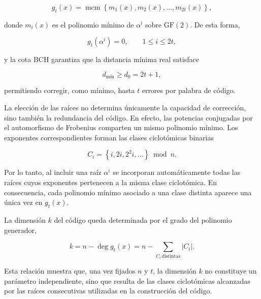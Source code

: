 \documentclass[10pt,a4paper]{article}
\begin{document}
\begin{equation}
    g_t(x)
    =
    \operatorname{mcm}
    \left\{
        m_1(x),m_2(x),\ldots,m_{2t}(x)
    \right\},
    \label{eq:generador-bch-general}
\end{equation}

donde $m_i(x)$ es el polinomio mínimo de $\alpha^i$ sobre $\mathrm{GF}(2)$.
De esta forma,

\begin{equation}
    g_t(\alpha^i)=0,
    \qquad 1\leq i\leq2t,
\end{equation}

y la cota BCH garantiza que la distancia mínima real satisface

\begin{equation}
    d_{\min}\geq d_0=2t+1,
\end{equation}

permitiendo corregir, como mínimo, hasta $t$ errores por palabra de código.

La elección de las raíces no determina únicamente la capacidad de corrección,
sino también la redundancia del código. En efecto, las potencias conjugadas
por el automorfismo de Frobenius comparten un mismo polinomio mínimo. Los
exponentes correspondientes forman las clases ciclotómicas binarias

\begin{equation}
    C_i
    =
    \left\{
        i,2i,2^2i,\ldots
    \right\}
    \bmod n.
    \label{eq:clase-ciclotomica}
\end{equation}

Por lo tanto, al incluir una raíz $\alpha^i$ se incorporan automáticamente
todas las raíces cuyos exponentes pertenecen a la misma clase ciclotómica.
En consecuencia, cada polinomio mínimo asociado a una clase distinta aparece
una única vez en $g_t(x)$.

La dimensión $k$ del código queda determinada por el grado del polinomio
generador,

\begin{equation}
    k
    =
    n-\deg g_t(x)
    =
    n-
    \sum_{C_i\,\text{distintas}}
    \lvert C_i\rvert.
    \label{eq:dimension-bch-cosets}
\end{equation}

Esta relación muestra que, una vez fijados $n$ y $t$, la dimensión $k$ no
constituye un parámetro independiente, sino que resulta de las clases
ciclotómicas alcanzadas por las raíces consecutivas utilizadas en la
construcción del código.
\end{document}
